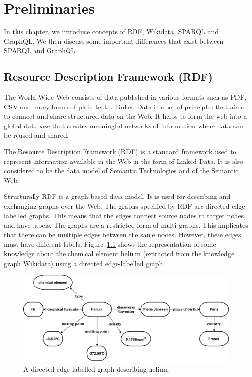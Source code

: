 \chapter{Preliminaries}
\label{ch:2}

In this chapter, we introduce concepts of RDF, Wikidata, SPARQL and GraphQL. We then discuss some important differences that exist between SPARQL and GraphQL.
\section{Resource Description Framework (RDF)}
The World Wide Web consists of data published in various formats such as PDF, CSV and many forms of plain text~\cite{Ruth2013}. Linked Data is a set of principles that aims to connect and share structured data on the Web. It helps to form the web into a global database that creates meaningful networks of information where data can be reused and shared. 

The Resource Description Framework (RDF) is a standard framework used to represent information available in the Web in the form of Linked Data. It is also considered to be the data model of Semantic Technologies and of the Semantic Web.

Structurally RDF is a graph based data model. It is used for describing and exchanging graphs over the Web. The graphs specified by RDF are directed edge-labelled graphs. This means that the edges connect source nodes to target nodes, and have labels. The graphs are a restricted form of multi-graphs. This implicates that there can be multiple edges between the same nodes. However, these edges must have different labels. Figure~\ref{fig:2} shows the representation of some knowledge about the chemical element helium (extracted from the knowledge graph Wikidata) using a directed edge-labelled graph. 


\begin{figure}[h]
  \centering
  \includegraphics[width=0.75\linewidth]{images/del_graph.drawio.pdf}
  \caption{A directed edge-labelled graph describing helium}
  \label{fig:2}
\end{figure}


